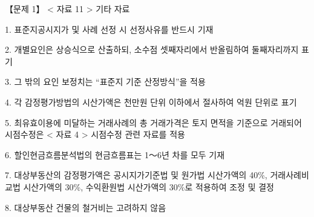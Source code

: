 \begin{longquestion}{【문제 1】}
< 자료 11 > 기타 자료 \par
1. 표준지공시지가 및 사례 선정 시 선정사유를 반드시 기재 \par
2. 개별요인은 상승식으로 산출하되, 소수점 셋째자리에서 반올림하여 둘째자리까지 표기 \par
3. 그 밖의 요인 보정치는 “표준지 기준 산정방식”을 적용 \par
4. 각 감정평가방법의 시산가액은 천만원 단위 이하에서 절사하여 억원 단위로 표기 \par
5. 최유효이용에 미달하는 거래사례의 총 거래가격은 토지 면적을 기준으로 거래되어 시점수정은 < 자료 4 > 시점수정 관련 자료를 적용 \par
6. 할인현금흐름분석법의 현금흐름표는 1～6년 차를 모두 기재 \par
7. 대상부동산의 감정평가액은 공시지가기준법 및 원가법 시산가액의 40\%, 거래사례비교법 시산가액의 30\%, 수익환원법 시산가액의 30\%로 적용하여 조정 및 결정 \par
8. 대상부동산 건물의 철거비는 고려하지 않음 \par
\end{longquestion}
